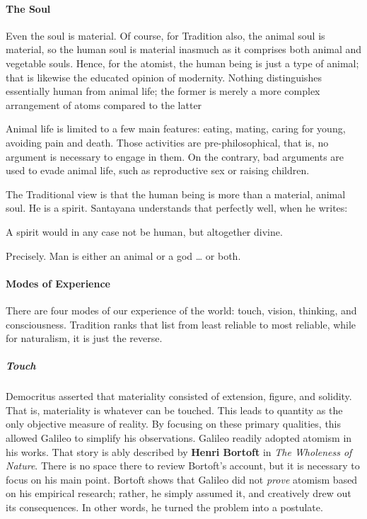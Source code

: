 \paragraph{The Soul}
Even the soul is material. Of course, for Tradition also, the animal soul is material, so the human soul is material inasmuch as it comprises both animal and vegetable souls. Hence, for the atomist, the human being is just a type of animal; that is likewise the educated opinion of modernity. Nothing distinguishes essentially human from animal life; the former is merely a more complex arrangement of atoms compared to the latter

Animal life is limited to a few main features: eating, mating, caring for young, avoiding pain and death. Those activities are pre-philosophical, that is, no argument is necessary to engage in them. On the contrary, bad arguments are used to evade animal life, such as reproductive sex or raising children.

The Traditional view is that the human being is more than a material, animal soul. He is a spirit. Santayana understands that perfectly well, when he writes:

\begin{quotex}
A spirit would in any case not be human, but altogether divine.

\end{quotex}
Precisely. Man is either an animal or a god … or both.

\paragraph{Modes of Experience}
There are four modes of our experience of the world: touch, vision, thinking, and consciousness. Tradition ranks that list from least reliable to most reliable, while for naturalism, it is just the reverse.

\subparagraph{Touch}
Democritus asserted that materiality consisted of extension, figure, and solidity. That is, materiality is whatever can be touched. This leads to quantity as the only objective measure of reality. By focusing on these primary qualities, this allowed Galileo to simplify his observations. Galileo readily adopted atomism in his works. That story is ably described by \textbf{Henri Bortoft} in \emph{The Wholeness of Nature}. There is no space there to review Bortoft's account, but it is necessary to focus on his main point. Bortoft shows that Galileo did not \emph{prove} atomism based on his empirical research; rather, he simply assumed it, and creatively drew out its consequences. In other words, he turned the problem into a postulate.

